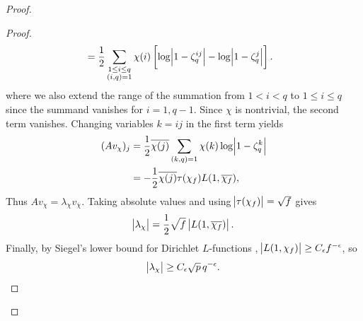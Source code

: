 \documentclass[10pt,a4paper]{amsart}
\begin{document}
\begin{proof}
\begin{proof}
\begin{align*}
&=
\frac{1}{2}
\sum_{\substack{1 \leq i \leq q \\ (i,q) = 1}}
\chi(i)
\left[
\log\abs{1-\zeta_q^{ij}} - \log\abs{1-\zeta_q^j}
\right].
\end{align*}
where we also extend the range of the summation from $1 < i < q$ to $1 \leq i \leq q$ since the summand vanishes for $i = 1, q-1$. Since $\chi$ is nontrivial, the second term vanishes. Changing variables $k=ij$ in the first term yields
\begin{align*}
(A v_\chi)_j
&=
\frac{1}{2}
\overline{\chi(j)}
    \sum_{(k,q)=1}
    \chi(k)\log\abs{1-\zeta_q^k}
\\
&=
-\frac{1}{2}
\overline{\chi(j)}
\tau(\chi_f)L(1,\overline{\chi_f}),
\end{align*}
Thus $A v_\chi = \lambda_\chi v_{\overline{\chi}}$. Taking absolute values and using $\abs{\tau(\chi_f)}=\sqrt{f}$ gives
\[
\abs{\lambda_\chi}
=
\frac{1}{2}\sqrt{f}\,\abs{L(1,\overline{\chi_f})}.
\]
Finally, by Siegel's lower bound for Dirichlet $L$-functions \cite[Ch.~21]{Davenport2000}, $\abs{L(1,\chi_f)} \ge C_\epsilon f^{-\epsilon}$, so
\[
\abs{\lambda_\chi} \ge C_\epsilon \sqrt{p}\, q^{-\epsilon}.
\]
\end{proof}



\end{proof}
\end{document}
